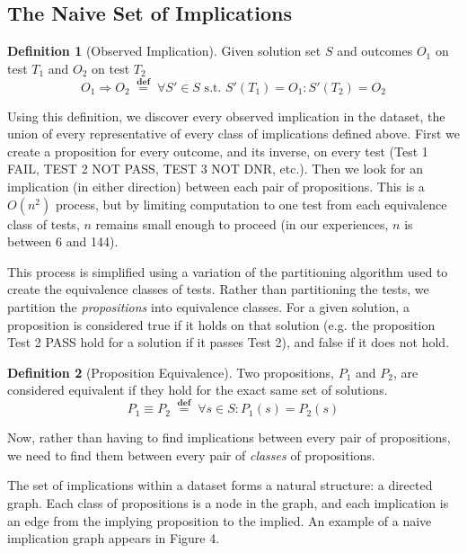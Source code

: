 \documentclass[11pt,twoside]{article}
\newcommand\defined{\mathrel{\;\stackrel{\scriptscriptstyle\mathbf{def}}{=}\;}}
\theoremstyle{definition}
\newtheorem{defn}{Definition}
\begin{document}
\subsection{The Naive Set of Implications}
\begin{defn}[Observed Implication]
Given solution set $S$ and outcomes $O_1$ on test $T_1$ and $O_2$ on test $T_2$
$$O_1 \Rightarrow O_2 \defined \forall S' \in S \mbox{ s.t. } S'(T_1) = O_1 : S'(T_2) = O_2$$
\end{defn}

Using this definition, we discover every observed implication in the dataset, the union of every representative of every class of implications defined above. First we create a proposition for every outcome, and its inverse, on every test (Test 1 FAIL, TEST 2 NOT PASS, TEST 3 NOT DNR, etc.). Then we look for an implication (in either direction) between each pair of propositions. This is a $O(n^2)$ process, but by limiting computation to one test from each equivalence class of tests, $n$ remains small enough to proceed (in our experiences, $n$ is between 6 and 144).

This process is simplified using a variation of the partitioning algorithm used to create the equivalence classes of tests. Rather than partitioning the tests, we partition the \emph{propositions} into equivalence classes. For a given solution, a proposition is considered true if it holds on that solution (e.g. the proposition Test 2 PASS hold for a solution if it passes Test 2), and false if it does not hold. 
\begin{defn}[Proposition Equivalence]
Two propositions, $P_1$ and $P_2$, are considered equivalent if they hold for the exact same set of solutions.
$$P_1 \equiv P_2 \defined \forall s \in S : P_1(s) = P_2(s)$$
\end{defn}
Now, rather than having to find implications between every pair of propositions, we need to find them between every pair of \emph{classes} of propositions.

The set of implications within a dataset forms a natural structure: a directed graph. Each class of propositions is a node in the graph, and each implication is an edge from the implying proposition to the implied. An example of a naive implication graph appears in Figure 4.
\end{document}
